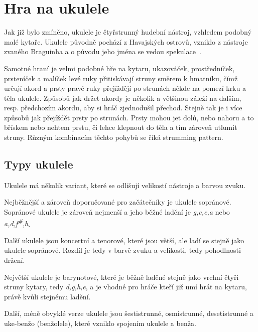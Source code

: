\section{Hra na ukulele}
\label{sc:ukulele_playing}
Jak již bylo zmíněno, ukulele je čtyřstrunný hudební nástroj, vzhledem podobný malé kytaře. Ukulele původně pochází z Havajských ostrovů, vzniklo z nástroje zvaného Braguinha a o původu jeho jména se vedou spekulace~\cite{rek_2008_kola}.

Samotné hraní je velmi podobné hře na kytaru, ukazováček, prostředníček, prsteníček a malíček levé ruky přitiskávají struny směrem k hmatníku, čímž určují akord a prsty pravé ruky přejíždějí po strunách někde na pomezí krku a těla ukulele. Způsobů jak držet akordy je několik a většinou záleží na dalším, resp. předchozím akordu, aby si hráč zjednodušil přechod. Stejně tak je i více způsobů jak přejíždět prsty po strunách. Prsty mohou jet dolů, nebo nahoru a to břískem nebo nehtem prstu, či lehce klepnout do těla a tím zároveň utlumit struny. Různým kombinacím těchto pohybů se říká \gls{strumming pattern}.

\subsection{Typy ukulele}
\label{ss:ukulele_types}
Ukulele má několik variant, které se odlišují velikostí nástroje a barvou zvuku.

Nejběžnější a zároveň doporučované pro začátečníky je ukulele sopránové. Sopránové ukulele je zároveň nejmenší a jeho běžné ladění je \textit{g,c,e,a} nebo \textit{a,d,f\textsuperscript{\#},h}.

Další ukulele jsou koncertní a tenorové, které jsou větší, ale ladí se stejně jako ukulele sopránové. Rozdíl je tedy v barvě zvuku a velikosti, tedy pohodlnosti držení.

Největší ukulele je barynotové, které je běžně laděné stejně jako vrchní čtyři struny kytary, tedy \textit{d,g,h,e}, a je vhodné pro hráče kteří již umí hrát na kytaru, právě kvůli stejnému ladění.

Další, méně obvyklé verze ukulele jsou šestistrunné, osmistrunné, desetistrunné a uke-benžo (benžolele), které vzniklo spojením ukulele a benža.
